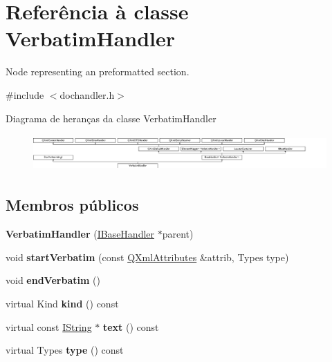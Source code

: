 \hypertarget{class_verbatim_handler}{\section{Referência à classe Verbatim\-Handler}
\label{class_verbatim_handler}
}


Node representing an preformatted section.  




{\ttfamily \#include $<$dochandler.\-h$>$}

Diagrama de heranças da classe Verbatim\-Handler\begin{figure}[H]
\begin{center}
\leavevmode
\includegraphics[height=1.409692cm]{class_verbatim_handler}
\end{center}
\end{figure}
\subsection*{Membros públicos}
\begin{DoxyCompactItemize}
\item 
\hypertarget{class_verbatim_handler_ae5088dea92836fb26e93c195fc134550}{{\bfseries Verbatim\-Handler} (\hyperlink{class_i_base_handler}{I\-Base\-Handler} $\ast$parent)}\label{class_verbatim_handler_ae5088dea92836fb26e93c195fc134550}

\item 
\hypertarget{class_verbatim_handler_a843268385c69fecf6828d40892b5e7d0}{void {\bfseries start\-Verbatim} (const \hyperlink{class_q_xml_attributes}{Q\-Xml\-Attributes} \&attrib, Types type)}\label{class_verbatim_handler_a843268385c69fecf6828d40892b5e7d0}

\item 
\hypertarget{class_verbatim_handler_a0b57fc5a500cb8d9c96b42aa0428c93a}{void {\bfseries end\-Verbatim} ()}\label{class_verbatim_handler_a0b57fc5a500cb8d9c96b42aa0428c93a}

\item 
\hypertarget{class_verbatim_handler_af8e62c8a81ddf2283205cc8955de50eb}{virtual Kind {\bfseries kind} () const }\label{class_verbatim_handler_af8e62c8a81ddf2283205cc8955de50eb}

\item 
\hypertarget{class_verbatim_handler_a38ed11cab67ca9bf8d04302e53b86a69}{virtual const \hyperlink{class_i_string}{I\-String} $\ast$ {\bfseries text} () const }\label{class_verbatim_handler_a38ed11cab67ca9bf8d04302e53b86a69}

\item 
\hypertarget{class_verbatim_handler_ada76a4f391850a616335245f2634b41c}{virtual Types {\bfseries type} () const }\label{class_verbatim_handler_ada76a4f391850a616335245f2634b41c}

\end{DoxyCompactItemize}
